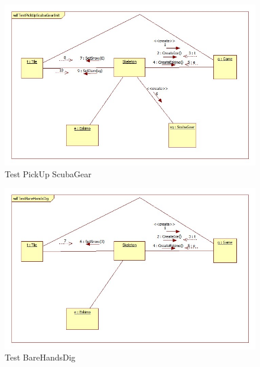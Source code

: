 \begin{figure}[h]
	\begin{center}
		\includegraphics[width=17cm]{chapters/chapter05/diagrams/TestPickUpScubaGearInit.jpg}
		\caption{Test PickUp ScubaGear}
		\label{fig:Test PickUp ScubaGear}
	\end{center}
\end{figure}

\begin{figure}[h]
	\begin{center}
		\includegraphics[width=17cm]{chapters/chapter05/diagrams/TestBareHandsDigInit.jpg}
		\caption{Test BareHandsDig}
		\label{fig:Test BareHandsDig}
	\end{center}
\end{figure}


